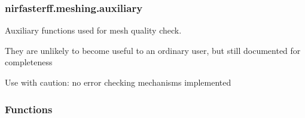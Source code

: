 \documentclass[letterpaper,10pt,english]{sphinxmanual}
\begin{document}
\sphinxstepscope


\subsubsection{nirfasterff.meshing.auxiliary}
\label{\detokenize{_autosummary/nirfasterff.meshing.auxiliary:module-nirfasterff.meshing.auxiliary}}\label{\detokenize{_autosummary/nirfasterff.meshing.auxiliary:nirfasterff-meshing-auxiliary}}\label{\detokenize{_autosummary/nirfasterff.meshing.auxiliary::doc}}
\sphinxAtStartPar
Auxiliary functions used for mesh quality check.

\sphinxAtStartPar
They are unlikely to become useful to an ordinary user, but still documented for completeness

\sphinxAtStartPar
Use with caution: no error checking mechanisms implemented
\subsubsection*{Functions}
\end{document}
